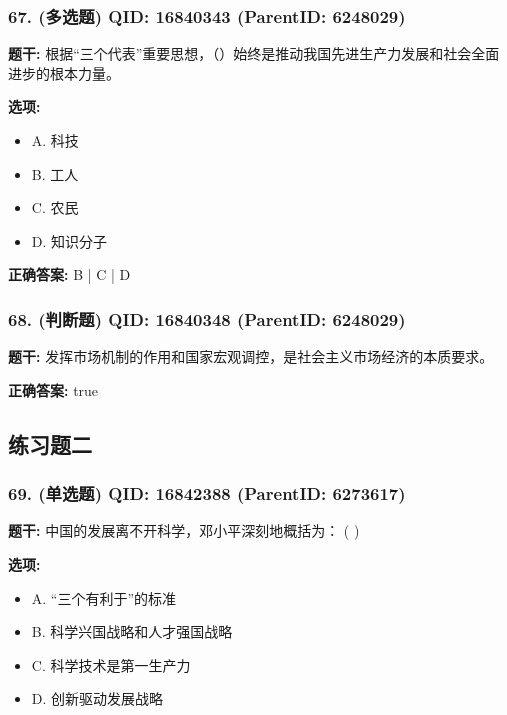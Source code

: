 \documentclass[12pt,UTF8]{ctexart}
\begin{document}
\subsubsection*{67. (多选题) \small QID: 16840343 (ParentID: 6248029)}

\textbf{题干:}
根据“三个代表”重要思想，（）始终是推动我国先进生产力发展和社会全面进步的根本力量。



\textbf{选项:}
\begin{itemize}[leftmargin=*]

  \item A. 科技

  \item B. 工人

  \item C. 农民

  \item D. 知识分子

\end{itemize}

\textbf{正确答案:}
B | C | D

\vspace{0.3em}\hrulefill\vspace{0.7em}

\subsubsection*{68. (判断题) \small QID: 16840348 (ParentID: 6248029)}

\textbf{题干:}
发挥市场机制的作用和国家宏观调控，是社会主义市场经济的本质要求。



\textbf{正确答案:}
true

\vspace{0.3em}\hrulefill\vspace{0.7em}

\subsection*{练习题二}

\subsubsection*{69. (单选题) \small QID: 16842388 (ParentID: 6273617)}

\textbf{题干:}
中国的发展离不开科学，邓小平深刻地概括为： ( )



\textbf{选项:}
\begin{itemize}[leftmargin=*]

  \item A. “三个有利于”的标准

  \item B. 科学兴国战略和人才强国战略

  \item C. 科学技术是第一生产力

  \item D. 创新驱动发展战略

\end{itemize}
\end{document}
